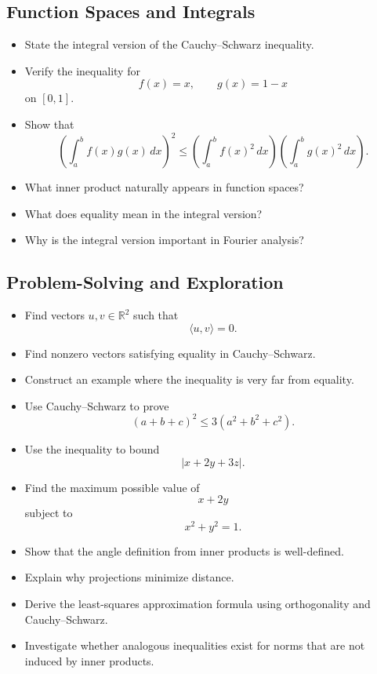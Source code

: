 \subsection{Function Spaces and Integrals}

\begin{itemize}[resume]
  \item State the integral version of the Cauchy--Schwarz inequality.
  \item Verify the inequality for
    \[ f(x)=x, \qquad g(x)=1-x \]
    on \([0,1]\).
  \item Show that
    \[ \left(\int_{a}^{b} f(x)g(x)\,dx\right)^{2} \le \left(\int_{a}^{b} f(x)^{2}\,dx\right) \left(\int_{a}^{b} g(x)^{2}\,dx\right). \]
  \item What inner product naturally appears in function spaces?
  \item What does equality mean in the integral version?
  \item Why is the integral version important in Fourier analysis?
\end{itemize}

\subsection{Problem-Solving and Exploration}

\begin{itemize}[resume]
  \item Find vectors \(u,v \in \mathbb{R}^{2}\) such that
    \[ \langle u,v\rangle = 0. \]
  \item Find nonzero vectors satisfying equality in Cauchy--Schwarz.
  \item Construct an example where the inequality is very far from equality.
  \item Use Cauchy--Schwarz to prove
    \[ (a+b+c)^{2} \le 3(a^{2}+b^{2}+c^{2}). \]
  \item Use the inequality to bound
    \[ |x+2y+3z|. \]
  \item Find the maximum possible value of
    \[ x+2y \]
    subject to
    \[ x^{2}+y^{2}=1. \]
  \item Show that the angle definition from inner products is well-defined.
  \item Explain why projections minimize distance.
  \item Derive the least-squares approximation formula using orthogonality and Cauchy--Schwarz.
  \item Investigate whether analogous inequalities exist for norms that are not induced by inner products.
\end{itemize}
